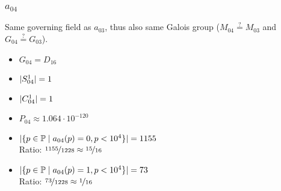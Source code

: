 \subsubsection{$a_{04}$}
Same governing field as $a_{03}$, thus also same Galois group ($M_{04} \stackrel{?}{=} M_{03}$ and $G_{04} \stackrel{?}{=} G_{03}$).
\begin{multicols}{2}
	\begin{itemize}
		\item $G_{04} = D_{16}$
		\item $| S_{04}^1 | = 1$
		\item $| C_{04}^1 | = 1$
		\item $P_{04} \approx 1.064 \cdot 10^{-120}$
	\end{itemize}
	\begin{itemize}
		\item $| \{ p \in \mathbb{P} \mid a_{04}(p)=0, p<10^4 \} | = 1155$\\
		Ratio: $\nicefrac{ 1155 }{ 1228 } \approx \nicefrac{ 15 }{ 16 }$
		\item $| \{ p \in \mathbb{P} \mid a_{04}(p)=1, p<10^4 \} | = 73$\\
		Ratio: $\nicefrac{ 73 }{ 1228 } \approx \nicefrac{ 1 }{ 16 }$
	\end{itemize}
\end{multicols}

